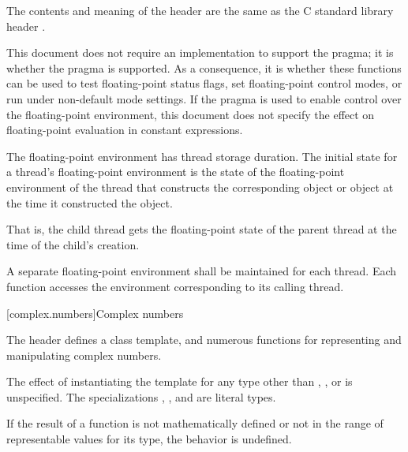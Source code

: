 \pnum
The contents and meaning of the header 
are the same as the C standard library header .
\begin{note}
This document does not require an implementation to support the
 pragma;
it is 
whether the pragma is supported. As a consequence,
it is 
whether these functions can be used to test floating-point status flags,
set floating-point control modes, or run under non-default mode settings.
If the pragma is used to enable control over the floating-point environment,
this document does not specify the effect on
floating-point evaluation in constant expressions.
\end{note}

\pnum
The floating-point environment has thread storage
duration. The initial state for a thread's floating-point
environment is the state of the floating-point environment of the thread that constructs
the corresponding  object
or  object
at the time it
constructed the object. \begin{note} That is, the child thread gets the floating-point
state of the parent thread at the time of the child's creation. \end{note}

\pnum
A separate floating-point environment shall be maintained for each thread. Each function
accesses the environment corresponding to its calling thread.


[complex.numbers]{Complex numbers}

\pnum
The header
%
defines a
class template,
and numerous functions for representing and manipulating complex numbers.

\pnum
The effect of instantiating the template
for any type other than , , or  is unspecified.
The specializations
,
, and
 are literal types.

\pnum
If the result of a function is not mathematically defined or not in
the range of representable values for its type, the behavior is
undefined.

